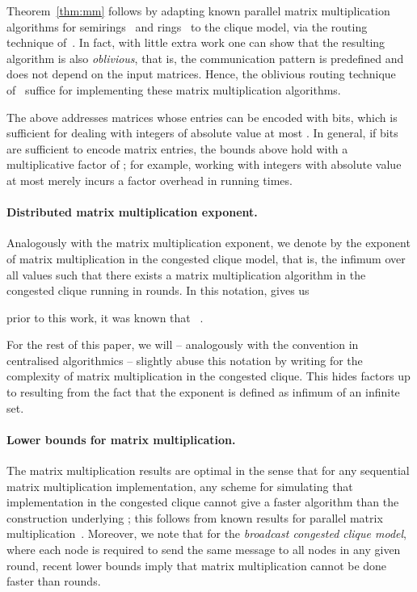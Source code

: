 Theorem~\ref{thm:mm} follows by adapting known parallel matrix multiplication algorithms for semirings~\cite{AgarwalBGJP95_3d,mccoll1995scalable} and rings~\cite{LuoD95_layout_parallel,mccoll1996,tiskin-phd,BallardDHLS12_Strassen_upper} to the clique model, via the routing technique of~\citet{lenzen2013optimal}. In fact, with little extra work one can show that the resulting algorithm is also \emph{oblivious}, that is, the communication pattern is predefined and does not depend on the input matrices.
Hence, the oblivious routing technique of~\citet{tritri} suffice for implementing these matrix multiplication algorithms.

The above addresses matrices whose entries can be encoded with  bits, which is sufficient for dealing with integers of absolute value at most . In general, if  bits are sufficient to encode matrix entries, the bounds above hold with a multiplicative factor of ; for example, working with integers with absolute value at most  merely incurs a factor  overhead in running times.

\paragraph{Distributed matrix multiplication exponent.}
Analogously with the matrix multiplication exponent, we denote by  the exponent of matrix multiplication in the congested clique model, that is, the infimum over all values  such that there exists a matrix multiplication algorithm in the congested clique running in  rounds. In this notation,  gives us

prior to this work, it was known that ~\cite{drucker13}.

For the rest of this paper, we will -- analogously with the convention in centralised algorithmics -- slightly abuse this notation by writing  for the complexity of matrix multiplication in the congested clique. This hides factors up to  resulting from the fact that the exponent  is defined as infimum of an infinite set.

\paragraph{Lower bounds for matrix multiplication.}
The matrix multiplication results are optimal in the sense that for any sequential matrix multiplication implementation, any scheme for simulating that implementation in the congested clique cannot give a faster algorithm than the construction underlying ; this follows from known results for parallel matrix multiplication~\cite{BallardDHS12_strassen_lower, IronyTT04_3d_lower,AggarwalCS90_PRAM,tiskin1998}. Moreover, we note that for the \emph{broadcast congested clique model}, where each node is required to send the same message to all nodes in any given round, recent lower bounds \cite{arXiv:1412.3445} imply that matrix multiplication cannot be done faster than  rounds. 


